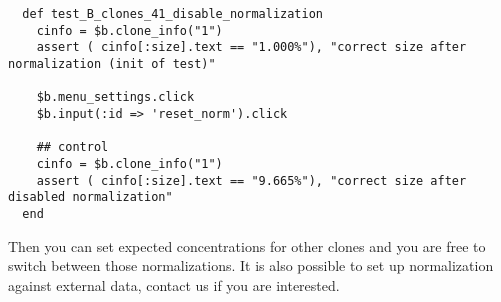 \begin{verbatim}
  def test_B_clones_41_disable_normalization
    cinfo = $b.clone_info("1")
    assert ( cinfo[:size].text == "1.000%"), "correct size after normalization (init of test)"
    
    $b.menu_settings.click
    $b.input(:id => 'reset_norm').click

    ## control
    cinfo = $b.clone_info("1")
    assert ( cinfo[:size].text == "9.665%"), "correct size after disabled normalization"
  end
\end{verbatim}

Then you can set expected concentrations for other clones and you are free to
switch between those normalizations.
It is also possible to set up normalization against external data,
contact us if you are interested.

